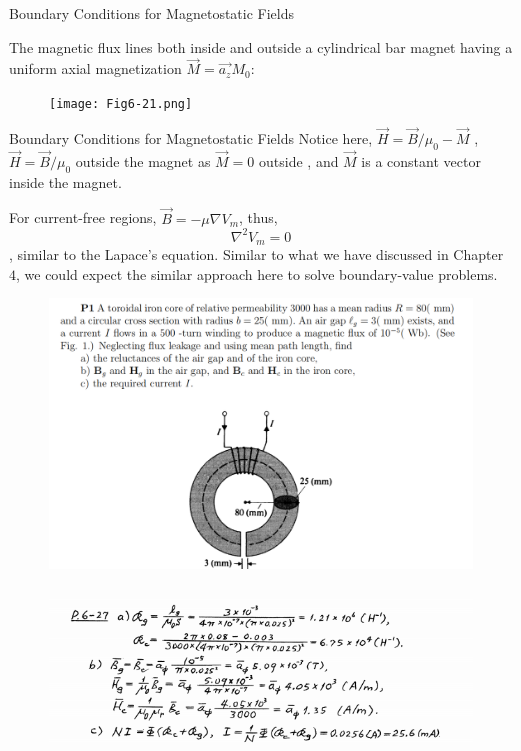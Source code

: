 \documentclass[xcolor={dvipsnames}]{beamer}
\begin{document}
\begin{frame}{Boundary Conditions for Magnetostatic Fields}

The magnetic flux lines both inside and outside a cylindrical bar magnet having a uniform axial magnetization $\vec{M} = \vec{a_z}M_0$:

\begin{figure}[H]
  \centering
  \texttt{[image: Fig6-21.png]}
\end{figure}



\end{frame}
\begin{frame}{Boundary Conditions for Magnetostatic Fields}
Notice here, $\vec{H} = \vec{B}/\mu_0 - \vec{M}$ , $\vec{H} = \vec{B}/\mu_0$ outside the magnet as $\vec{M} = 0$ outside , and $\vec{M}$ is a constant vector inside the magnet.

For current-free regions, $\vec{B} = -\mu\nabla V_m$, thus, 
$$
\nabla^2 V_m = 0
$$
, similar to the Lapace's equation. Similar to what we have discussed in Chapter $4$, we could expect the similar approach here to solve boundary-value problems.
\end{frame}
\begin{frame}
\begin{figure}[H]
	\centering
	\includegraphics[width=0.9\linewidth]{7_1.png}
\end{figure}
\end{frame}
\begin{frame}
\begin{figure}[H]
	\centering
	\includegraphics[width=0.9\linewidth]{7_2.png}
\end{figure}
\end{frame}
\end{document}
